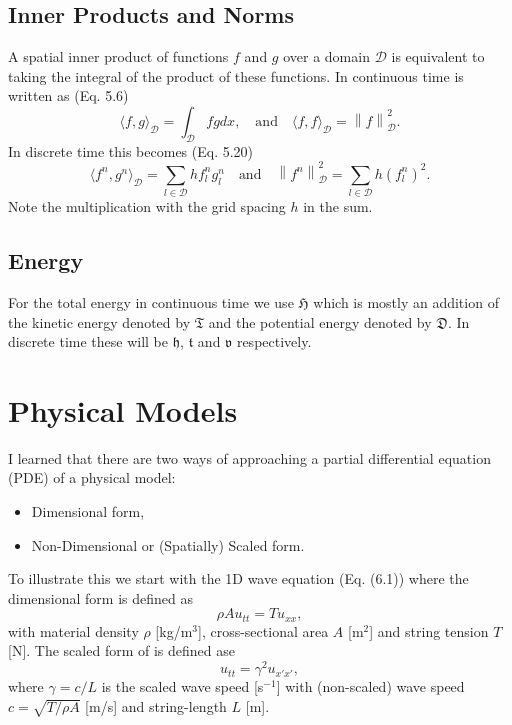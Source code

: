 \documentclass{article}
\begin{document}
\subsection{Inner Products and Norms}
A spatial inner product of functions $f$ and $g$ over a domain $\mathcal{D}$ is equivalent to taking the integral of the product of these functions. In continuous time is written as (Eq. 5.6)
\begin{equation}
    \langle f,g\rangle_\mathcal{D} = \int_\mathcal{D}fgdx, 
\quad \text{and} \quad 
    \langle f,f \rangle_\mathcal{D} = \left\lVert f \right\rVert^2_\mathcal{D}.
\end{equation}
In discrete time this becomes (Eq. 5.20)
\begin{equation}\label{eq:innerProduct}
     \langle f^n,g^n\rangle_\mathcal{D} = \sum_{l\in\mathcal{D}}h f^n_l g^n_l \quad \text{and} \quad \left\lVert f^n \right\rVert^2_\mathcal{D} = \sum_{l\in\mathcal{D}}h(f^n_l)^2.
\end{equation}
Note the multiplication with the grid spacing $h$ in the sum.
\subsection{Energy}
For the total energy in continuous time we use $\mathfrak{H}$ which is mostly an addition of the kinetic energy denoted by $\mathfrak{T}$ and the potential energy denoted by $\mathfrak{D}$. In discrete time these will be $\mathfrak{h}$, $\mathfrak{t}$ and $\mathfrak{v}$ %
respectively.
\section{Physical Models}
I learned that there are two ways of approaching a partial differential equation (PDE) of a physical model:
\begin{itemize} 
    \item Dimensional form,
    \item Non-Dimensional or (Spatially) Scaled form.
\end{itemize}
To illustrate this we start with the 1D wave equation (Eq. (6.1)) where the dimensional form is defined as
\begin{equation}\label{eq:1DWave}
    \rho A u_{tt} = T u_{xx}, 
\end{equation}
with material density $\rho$ [kg/m$^3$], cross-sectional area $A$ [m$^2$] and string tension $T$ [N].
The scaled form of is defined ase
\begin{equation}\label{eq:1DWaveScaled}
    u_{tt} = \gamma^2 u_{x'x'},
\end{equation}
where $\gamma = c/L$ is the scaled wave speed [s$^{-1}$] with (non-scaled) wave speed $c = \sqrt{T/\rho A}$ [m/s] and string-length $L$ [m].
\end{document}
